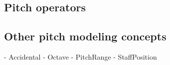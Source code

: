 \subsection{Pitch operators}

\begin{comment}
<abjad>
pitch_segment = pitchtools.PitchSegment("c' ef' b' bf' f' e' b a")
show(pitch_segment)
</abjad>
\end{comment}

\begin{comment}
<abjad>
transposition = pitchtools.Transposition(1)
show(transposition(pitch_segment))
</abjad>
\end{comment}

\begin{comment}
<abjad>
inversion = pitchtools.Inversion()
show(inversion(pitch_segment))
inversion_with_axis = pitchtools.Inversion(axis=NamedPitch("d'"))
show(inversion_with_axis(pitch_segment))
</abjad>
\end{comment}

\begin{comment}
<abjad>
retrogression = pitchtools.Retrogression()
show(retrogression(pitch_segment))
</abjad>
\end{comment}

\begin{comment}
<abjad>
untransposing_rotation = pitchtools.Rotation(-1, transpose=False)
show(untransposing_rotation(pitch_segment))
transposing_rotation = pitchtools.Rotation(-1, transpose=True)
show(transposing_rotation(pitch_segment))
</abjad>
\end{comment}

\begin{comment}
<abjad>
multiplication = pitchtools.Multiplication(3)
show(multiplication(pitch_segment))
</abjad>
\end{comment}

\begin{comment}
<abjad>
pitch_operation = pitchtools.PitchOperation(
    operators=(
        pitchtools.Rotation(1),
        pitchtools.Transposition(2),
        ),
    )
show(pitch_operation(pitch_segment))
</abjad>
\end{comment}

\subsection{Other pitch modeling concepts}

\begin{markdown}
-   Accidental
-   Octave
-   PitchRange
-   StaffPosition
\end{markdown}

